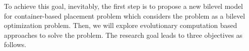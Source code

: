  To achieve this goal, inevitably, the first step is to propose a new bilevel model for container-based placement problem which considers the problem as a bilevel optimization problem. Then, we will explore evolutionary computation based approaches to solve the problem. The research goal leads to three objectives as follows.

